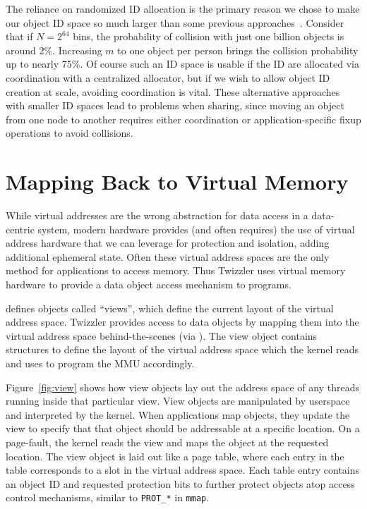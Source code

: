 The reliance on randomized ID allocation is the primary reason we chose to make our object ID space
so much larger than some previous approaches~\cite{pmdk,pmdk-pointers}. Consider that if $N = 2^{64}$
bins, the probability of collision with just one billion objects is around 2\%. Increasing $m$ to
one object per person brings the collision probability up to nearly 75\%. Of course such an ID space
is usable if the ID are allocated via coordination with a centralized allocator, but if
we wish to allow object ID creation at scale, avoiding coordination is vital. These alternative approaches with smaller ID spaces lead to problems when
sharing, since moving an object from one node to another requires either coordination or application-specific fixup
operations to avoid collisions.

\section{Mapping Back to Virtual Memory}


\label{sec:view}


While virtual addresses are the wrong abstraction
for data access in a data-centric system, modern hardware provides (and often requires) the use of virtual address
hardware that we can leverage for protection and isolation, adding additional ephemeral state. Often these virtual
address spaces are the only method for applications to access memory. Thus Twizzler uses virtual memory hardware to
provide a data object access mechanism to programs.

\Twizzler defines objects called ``views'', which define the current
layout of the virtual address space. Twizzler
provides access to data objects by mapping them into the virtual address space
behind-the-scenes (via \libcore). The view object contains structures to define the layout of the
virtual address space which the kernel reads and uses to program the MMU accordingly.

Figure~\ref{fig:view} shows how view objects lay out the address space of any threads running inside
that particular view. View objects are manipulated by userspace and interpreted by the kernel. When
applications map objects, they update the view to specify that that object should be addressable at
a specific location. On a page-fault, the kernel reads the view and maps the object at the requested
location. The view object is laid out like a page table, where each entry in the table corresponds
to a slot in the virtual address space. Each table entry contains an object ID and requested
protection bits to further protect objects atop access control mechanisms, similar to
\texttt{PROT\_*} in \texttt{mmap}.

